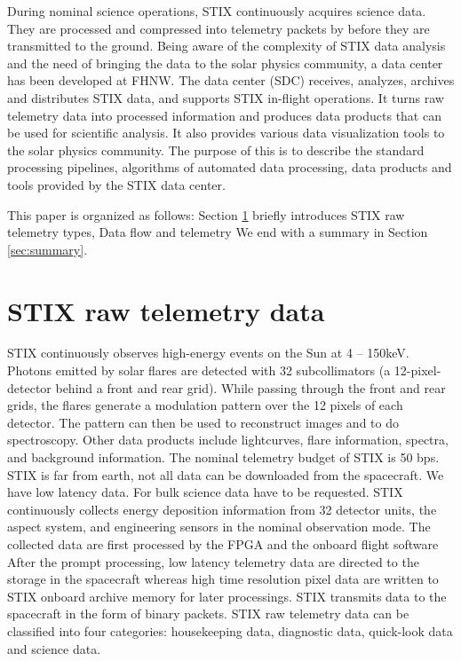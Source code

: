 \documentclass[referee]{aa} %
\begin{document}
During nominal science operations, STIX continuously acquires science data. 
They are processed and compressed into telemetry packets by
before they are transmitted to the ground.
Being aware of the complexity of STIX data analysis and 
the need of bringing the data to the solar physics community, a data center has been
developed at FHNW. The data center (SDC) receives, analyzes, archives and distributes STIX data,
 and supports STIX in-flight operations.
It turns raw telemetry data into processed information and produces data products that can be used for scientific analysis.
It also provides various data visualization tools to the solar physics community.
The purpose of this is to describe the standard processing pipelines, 
algorithms of automated data processing, data products and tools provided by the STIX data center.

This paper is organized as follows: Section \ref{sec:raw-data} briefly introduces STIX raw telemetry types, Data flow and telemetry
We end with a summary in Section \ref{sec:summary}.
\section{STIX raw telemetry data}
\label{sec:raw-data}

STIX continuously observes high-energy events on the Sun at 4 -- 150keV. 
Photons emitted by solar flares are detected with 32 subcollimators 
(a 12-pixel-detector behind a front and rear grid). While passing through the front and rear grids, 
the flares generate a modulation pattern over the 12 pixels of each detector. 
The pattern can then be used to reconstruct images and to do spectroscopy. 
Other data products include lightcurves, flare information, spectra, and background information.
The nominal telemetry budget of STIX is 50 bps.
STIX is far from earth, not all data can be downloaded from the spacecraft. We have low latency data.
For bulk science data have to be requested.
STIX continuously collects energy deposition information from 32 detector units, the aspect system,
and engineering sensors in the nominal observation mode.
The collected data are first processed by the FPGA and the onboard flight software
After the prompt processing, low latency telemetry data are directed to the
storage in the spacecraft whereas high time resolution pixel data are written to STIX onboard archive memory for
later processings.
STIX transmits data to the spacecraft in the form of binary packets.
STIX raw telemetry data can be classified into four
categories: housekeeping data, diagnostic data, quick-look data and science data.
\end{document}
